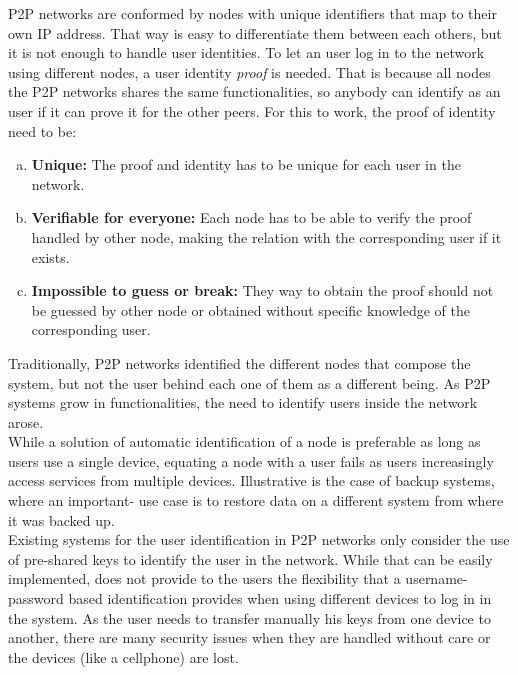 P2P networks are conformed by nodes with unique identifiers that map to their
own IP address. That way is easy to differentiate them between each others, but
it is not enough to handle user identities. To let an user log in to the
network using different nodes, a user identity \textit{proof} is needed. That
is because all nodes the P2P networks shares the same functionalities, so
anybody can identify as an user if it can prove it for the other peers. For
this to work, the proof of identity need to be:
\begin{enumerate}[a)]
  \item \textbf{Unique:} The proof and identity has to be unique for each user in the network.

  \item \textbf{Verifiable for everyone:}  Each node has to be able to verify the proof
    handled by other node, making the relation with the corresponding user if it
    exists.
  \item \textbf{Impossible to guess or break:} They way to obtain the proof should not
    be guessed by other node or obtained without specific knowledge of the
    corresponding user.
\end{enumerate}

Traditionally, P2P networks identified the different nodes that compose the
system, but not the user behind each one of them as a different being.
As P2P systems grow in functionalities, the need to identify users inside the
network arose.\\

While a solution of automatic identification of a node is preferable as long as
users use a single device, equating a node with a user fails as users
increasingly access services from multiple devices.
Illustrative is the case of backup systems, where an important-
  use case is to restore data on a different system from where
it was backed up. \\

Existing systems for the user identification in P2P networks only consider the
use of pre-shared keys to identify the user in the network. While that can
be easily implemented, does not provide to the users the flexibility that a
username-password based identification provides when using different devices to
log in in the system. As the user needs to transfer manually his keys from one
device to another, there are many security issues when they are handled without
care or the devices (like a cellphone) are lost. \\

